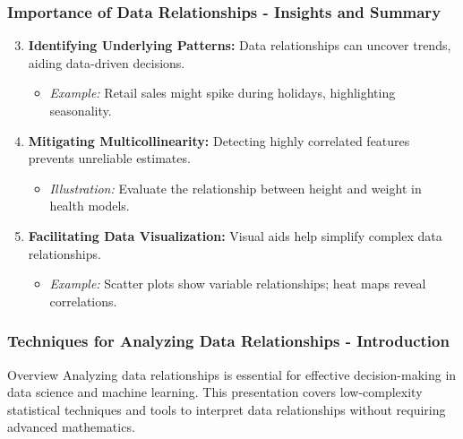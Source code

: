 \documentclass[aspectratio=169]{beamer}
\begin{document}
\begin{frame}[fragile]
    \frametitle{Importance of Data Relationships - Insights and Summary}
    \begin{enumerate}
        \setcounter{enumi}{2} 
        \item \textbf{Identifying Underlying Patterns:} 
            Data relationships can uncover trends, aiding data-driven decisions.
            \begin{itemize}
                \item \textit{Example:} Retail sales might spike during holidays, highlighting seasonality.
            \end{itemize}

        \item \textbf{Mitigating Multicollinearity:} 
            Detecting highly correlated features prevents unreliable estimates.
            \begin{itemize}
                \item \textit{Illustration:} Evaluate the relationship between height and weight in health models.
            \end{itemize}

        \item \textbf{Facilitating Data Visualization:} 
            Visual aids help simplify complex data relationships.
            \begin{itemize}
                \item \textit{Example:} Scatter plots show variable relationships; heat maps reveal correlations.
            \end{itemize}
    \end{enumerate}
\end{frame}

\begin{frame}[fragile]
    \frametitle{Techniques for Analyzing Data Relationships - Introduction}
    \begin{block}{Overview}
        Analyzing data relationships is essential for effective decision-making in data science and machine learning. This presentation covers low-complexity statistical techniques and tools to interpret data relationships without requiring advanced mathematics.
    \end{block}
\end{frame}
\end{document}
